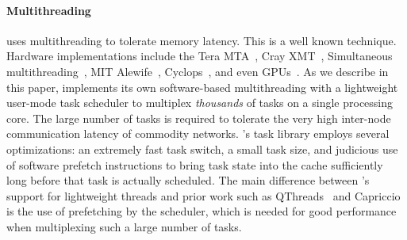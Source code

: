 \paragraph{Multithreading} \Grappa uses multithreading to tolerate memory
latency. This is a well known technique. Hardware implementations include the
Tera MTA~\cite{tera:mta1}, Cray XMT~\cite{feo:xmt}, Simultaneous
multithreading~\cite{tullsen:smt}, MIT Alewife~\cite{agarwal:alewife},
Cyclops~\cite{almasi:cyclops}, and even GPUs~\cite{gpus}. As we describe in
this paper, \Grappa implements its own software-based multithreading with a
lightweight user-mode task scheduler to multiplex \emph{thousands\/} of tasks
on a single processing core. The large number of tasks is required to tolerate
the very high inter-node communication latency of commodity networks. \Grappa's
task library employs several optimizations: an extremely fast task switch, a
small task size, and judicious use of software prefetch instructions to bring task state
into the cache sufficiently long before that task is actually scheduled. The main difference
between \Grappa's support for lightweight threads and prior work such as
QThreads~\cite{Wheeler08qthreads:an} and
Capriccio~\cite{Behren03capriccio:scalable} is the use of prefetching by the scheduler, which is needed for good performance
when multiplexing such a large number of tasks.


